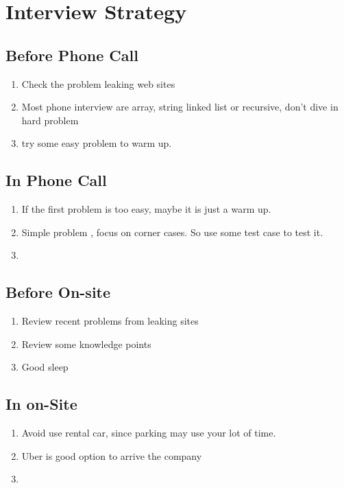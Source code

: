 \chapter{Interview Strategy}

\section{Before Phone Call }

\begin{enumerate}
    \item Check the problem leaking web sites
    \item Most phone interview are array, string linked list or recursive, don't dive in hard problem
    \item try some easy problem to warm up.
\end{enumerate}

\section{In Phone Call  }

\begin{enumerate}
    \item If the first problem is too easy, maybe it is just a warm up. 
    \item Simple problem , focus on corner cases. So use some test case to test it. 
    \item  
\end{enumerate}

\section{Before On-site }

\begin{enumerate}
    \item Review recent problems from leaking sites
    \item Review some knowledge points
    \item Good sleep
\end{enumerate}


\section{In on-Site }
\begin{enumerate}
    \item Avoid use rental car, since parking may use your lot of time.
    \item Uber is good option to arrive the company
    \item 
    
\end{enumerate}